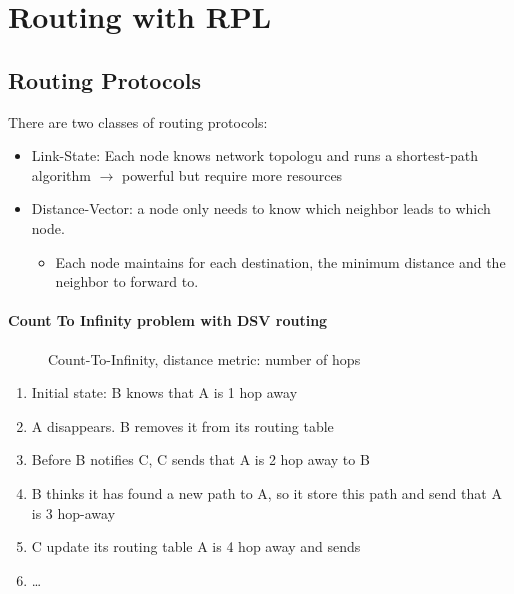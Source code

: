 
\section{Routing with RPL}

\subsection{Routing Protocols}

There are two classes of routing protocols:
\begin{itemize}
    \item Link-State: Each node knows network topologu and runs a shortest-path 
        algorithm $\to$ powerful but require more resources
    \item Distance-Vector: a node only needs to know which neighbor leads
        to which node.
        \begin{itemize}
            \item Each node maintains for each destination, the minimum distance
                and the neighbor to forward to.
        \end{itemize}
\end{itemize}

\paragraph{Count To Infinity problem with DSV routing}
\begin{figure}[ht!]
    \centering
    \caption{Count-To-Infinity, distance metric: number of hops}
\end{figure}

\begin{enumerate}
    \item Initial state: B knows that A is 1 hop away
    \item A disappears. B removes it from its routing table
    \item Before B notifies C, C sends that A is 2 hop away to B
    \item B thinks it has found a new path to A, so it store this path
        and send that A is 3 hop-away
    \item C update its routing table A is 4 hop away and sends
    \item \ldots
\end{enumerate}

